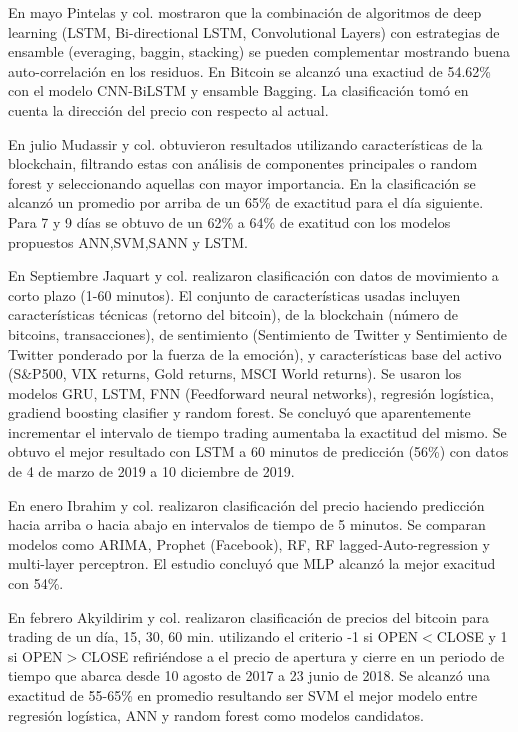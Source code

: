 En mayo Pintelas y col. \parencite*{pintelasInvestigatingProblemCryptocurrency2020} mostraron que la combinación de algoritmos de deep learning (LSTM, Bi-directional LSTM, Convolutional Layers) con estrategias de ensamble (everaging, baggin, stacking) se pueden complementar mostrando buena auto-correlación en los residuos.  En Bitcoin se alcanzó una exactiud de 54.62\% con el modelo CNN-BiLSTM y ensamble Bagging. La clasificación tomó en cuenta la dirección del precio con respecto al actual.

En julio Mudassir y col. \parencite*{mudassirTimeseriesForecastingBitcoin2020} obtuvieron resultados utilizando características de la blockchain, filtrando estas con análisis de componentes principales o random forest y seleccionando aquellas con mayor importancia. En la clasificación se alcanzó un promedio por arriba de un 65\% de exactitud para el día siguiente. Para 7 y 9 días se obtuvo de un 62\% a 64\% de exatitud con los modelos propuestos ANN,SVM,SANN y LSTM. 

En Septiembre Jaquart y col. \parencite*{jaquartShorttermBitcoinMarket2021} realizaron clasificación con datos de movimiento a corto plazo (1-60 minutos). El conjunto de características usadas incluyen características técnicas (retorno del bitcoin), de la blockchain (número de bitcoins, transacciones), de sentimiento (Sentimiento de Twitter y Sentimiento de Twitter ponderado por la fuerza de la emoción), y características base del activo (S\&P500, VIX returns, Gold returns, MSCI World returns). Se usaron los modelos GRU, LSTM, FNN (Feedforward neural networks), regresión logística, gradiend boosting clasifier y random forest. Se concluyó que aparentemente incrementar el intervalo de tiempo trading aumentaba la exactitud del mismo. Se obtuvo el mejor resultado con LSTM a 60 minutos de predicción (56\%) con datos de 4 de marzo de 2019 a 10 diciembre de 2019.

En enero Ibrahim y col. \parencite*{ibrahimPredictingMarketMovement2021} realizaron clasificación del precio haciendo predicción hacia arriba o hacia abajo en intervalos de tiempo de 5 minutos. Se comparan modelos como ARIMA, Prophet (Facebook), RF, RF lagged-Auto-regression y multi-layer perceptron. El estudio concluyó que MLP alcanzó la mejor exacitud con 54\%.

En febrero Akyildirim y col. \parencite*{akyildirimPredictionCryptocurrencyReturns2021} realizaron clasificación de precios del bitcoin para trading de un día, 15, 30, 60 min. utilizando el criterio -1 si OPEN$<$CLOSE y 1 si OPEN$>$CLOSE refiriéndose a el precio de apertura y cierre en un periodo de tiempo que abarca desde 10 agosto de 2017 a 23 junio de 2018. Se alcanzó una exactitud de 55-65\% en promedio resultando ser SVM el mejor modelo entre regresión logística, ANN y random forest como modelos candidatos.

